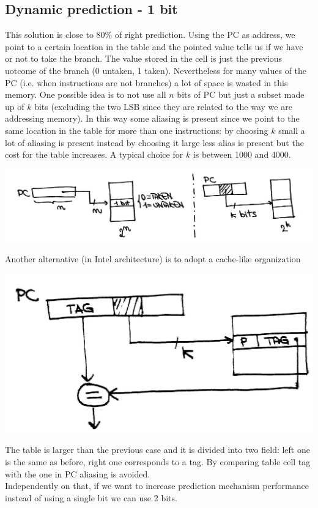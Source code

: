 \subsection{Dynamic prediction - 1 bit}
This solution is close to 80\% of right prediction.
Using the PC as address, we point to a certain location in the table and the
pointed value tells us if we have or not to take the branch. The value stored in
the cell is just the previous uotcome of the branch (0 untaken, 1 taken).
Nevertheless for many values of the PC (i.e. when instructions are not
branches) a lot of space is wasted in this memory. One possible idea is to not
use all $n$ bits of PC but just a subset made up of $k$ bits (excluding the two
LSB since they are related to the way we are addressing memory). In this way
some aliasing is present since we point to the same location in the table for
more than one instructions: by choosing $k$ small a lot of aliasing is present
instead by choosing it large less alias is present but the cost for the table
increases. A typical choice for $k$ is between 1000 and 4000.
\begin{center}
  \includegraphics[width=0.75\linewidth]{img/img3/15}
\end{center}
Another alternative (in Intel architecture) is to adopt a cache-like
organization
\begin{center}
  \includegraphics[width=0.6\linewidth]{img/img3/16}
\end{center}
The table is larger than the previous case and it is divided into two field:
left one is the same as before, right one corresponds to a tag. By comparing
table cell tag with the one in PC aliasing is avoided.\\
Independently on that, if we want to increase prediction mechanism performance
instead of using a single bit we can use 2 bits.
